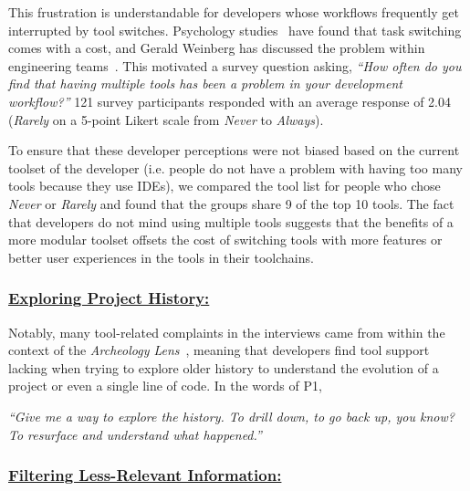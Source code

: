 This frustration is understandable for developers whose workflows frequently get interrupted by tool switches. Psychology studies~\cite{Meiran2000}\cite{gopher2000switching} have found that task switching comes with a cost, and Gerald Weinberg has discussed the problem within engineering teams~\cite{Weinberg1992}. 
This motivated a survey question asking, \textit{``How often do you find that having multiple tools has been a problem in your development workflow?''} 121 survey participants responded with an average response of 2.04 (\textit{Rarely} on a 5-point Likert scale from \textit{Never} to \textit{Always}). 

To ensure that these developer perceptions were not biased based on the current toolset of the developer (i.e. people do not have a problem with having too many tools because they use IDEs), we compared the tool list for people who chose \textit{Never} or \textit{Rarely} and found that the groups share 9 of the top 10 tools. The fact that developers do not mind using multiple tools suggests that the benefits of a more modular toolset offsets the cost of switching tools with more features or better user experiences in the tools in their toolchains. 

\subsubsection{\underline{Exploring Project History:}}
Notably, many tool-related complaints in the interviews came from within the context of the \textit{Archeology Lens}~\cite{mihai_lenses}, meaning that developers find tool support lacking when trying to explore older history to understand the evolution of a project or even a single line of code. In the words of P1, 

\begin{displayquote}
\textit{``Give me a way to explore the history. To drill down, to go back up, you know? To resurface and understand what happened.''}
\end{displayquote}


\subsubsection{\underline{Filtering Less-Relevant Information:}}

